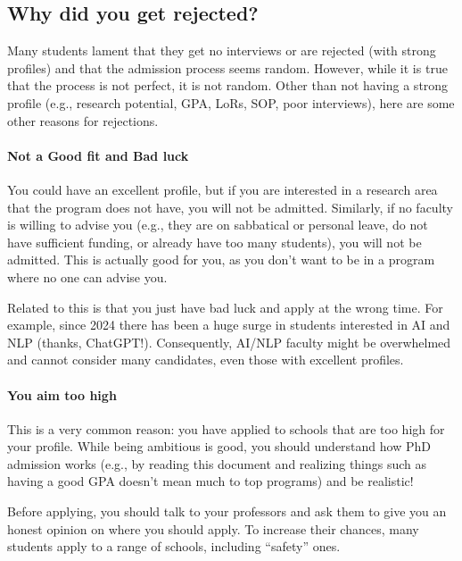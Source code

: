 \documentclass[oneside,11pt,dvipsnames]{book}
\def\subsectioninfo#1{%
    \addcontentsline{toc}{subsectioninfo}{%
    \noexpand\numberline{}\color{black}{#1}}%
}
\begin{document}
\subsection{Why did you get rejected?}\label{sec:why-rejected}
\subsectioninfo{You aim too high, are overqualified, or even because you applied to AI/ML, a super competitive field in recent years with many applicants.}

Many students lament that they get no interviews or are rejected (with strong profiles) and that the admission process seems random.  However, while it is true that the process is not perfect, it is not random.
Other than not having a strong profile (e.g., research potential, GPA, LoRs, SOP, poor interviews), here are some other reasons for rejections.


\paragraph{Not a Good fit and Bad luck}  You could have an excellent profile, but if you are interested in a research area that the program does not have, you will not be admitted.
Similarly, if no faculty is willing to advise you (e.g., they are on sabbatical or personal leave, do not have sufficient funding, or already have too many students), you will not be admitted.  This is actually good for you, as you don't want to be in a program where no one can advise you.

Related to this is that you just have bad luck and apply at the wrong time.  For example, since 2024 there has been a huge surge in students interested in AI and NLP (thanks, ChatGPT!). Consequently, AI/NLP faculty might be overwhelmed and cannot consider many candidates, even those with excellent profiles.


\paragraph{You aim too high} This is a very common reason: you have applied to schools that are too high for your profile. While being ambitious is good, you should understand how PhD admission works (e.g., by reading this document and realizing things such as having a good GPA doesn't mean much to top programs) and be realistic! 

Before applying, you should talk to your professors and ask them to give you an honest opinion on where you should apply. To increase their chances, many students apply to a range of schools, including ``safety'' ones. 
\end{document}
